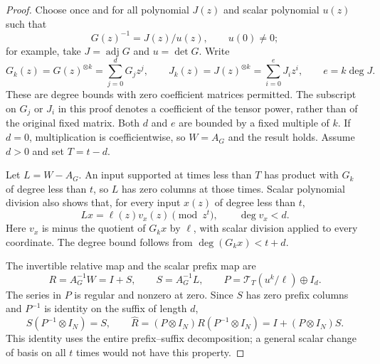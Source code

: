 \begin{proof}
Choose once and for all polynomial $J(z)$ and scalar polynomial $u(z)$
such that
\[
 G(z)^{-1}=J(z)/u(z),\qquad u(0)\ne0;
\]
for example, take $J=\operatorname{adj}G$ and $u=\det G$.  Write
\[
 G_k(z)=G(z)^{\otimes k}=\sum_{j=0}^{d}G_jz^j,
 \qquad
 J_k(z)=J(z)^{\otimes k}=\sum_{i=0}^{e}J_iz^i,
 \qquad e=k\deg J.
\]
These are degree bounds with zero coefficient matrices permitted.
The subscript on $G_j$ or $J_i$ in this proof denotes a coefficient of
the tensor power, rather than of the original fixed matrix.
Both $d$ and $e$ are bounded by a fixed multiple of $k$.
If $d=0$, multiplication is coefficientwise, so $W=A_G$ and the result
holds.  Assume $d>0$ and set $T=t-d$.

Let $L=W-A_G$.  An input supported at times less than $T$ has product
with $G_k$ of degree less than $t$, so $L$ has zero columns at those
times.  Scalar polynomial division also shows that, for every input
$x(z)$ of degree less than $t$,
\begin{equation}
 Lx=\ell(z)v_x(z)\pmod {z^t},\qquad \deg v_x<d.
 \label{feedback:eq:boundary-quotient}
\end{equation}
Here $v_x$ is minus the quotient of $G_kx$ by $\ell$, with scalar
division applied to every coordinate.  The degree bound follows from
$\deg(G_kx)<t+d$.

The invertible relative map and the scalar prefix map are
\[
 R=A_G^{-1}W=I+S,\qquad S=A_G^{-1}L,
 \qquad
 P=\mathcal T_T(u^k/\ell)\oplus I_d.
\]
The series in $P$ is regular and nonzero at zero.  Since $S$ has zero
prefix columns and $P^{-1}$ is identity on the suffix of length $d$,
\begin{equation}
 S(P^{-1}\otimes I_N)=S,\qquad
 \widehat R=(P\otimes I_N)R(P^{-1}\otimes I_N)
           =I+(P\otimes I_N)S.
 \label{feedback:eq:prefix-conjugation}
\end{equation}
This identity uses the entire prefix--suffix decomposition; a general
scalar change of basis on all $t$ times would not have this property.


\end{proof}
